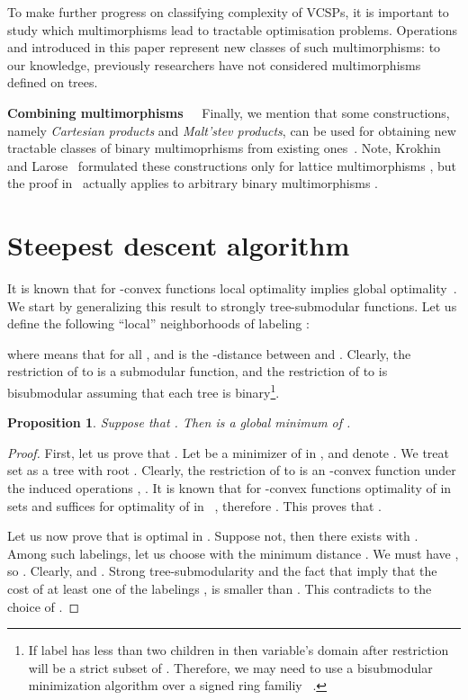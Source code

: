 \documentclass[11pt,onecolumn]{article}
\newtheorem{proposition}[theorem]{Proposition}
\newcommand{\myparagraph}[1]{{\vspace*{2pt}\noindent\bf{#1}~~}}
\begin{document}
To make further progress on classifying complexity of VCSPs, it is important to study which
multimorphisms lead to tractable optimisation problems. Operations  and  introduced in this paper
represent new classes of such multimorphisms: to our knowledge, previously researchers have not considered multimorphisms
defined on trees.

\myparagraph{Combining multimorphisms} Finally, we mention that some constructions, namely {\em Cartesian products} and {\em Malt'stev products},
can be used for obtaining new tractable classes of binary multimoprhisms from existing ones~\cite{KrokhinLarose:08}.
Note, Krokhin and Larose~\cite{KrokhinLarose:08} formulated these constructions only
for lattice multimorphisms , but the proof in~\cite{KrokhinLarose:08} actually applies to arbitrary binary multimorphisms .


\section{Steepest descent algorithm}\label{sec:alg}

It is known that for -convex functions local optimality implies global optimality~\cite{Murota:book}.
We start by generalizing this result to strongly tree-submodular functions. 
Let us define the following ``local'' neighborhoods of labeling :

where  means that  for all , and  is the -distance between  and .
Clearly, the restriction of  to  is a submodular function,
and the restriction of  to  is bisubmodular assuming that each tree  is binary\footnote{If label 
has less than two children in  then variable's domain after restriction will be a strict subset of .
Therefore, we may need to use a bisubmodular minimization algorithm over a signed ring familiy ~\cite{McCormick:10}.}.

\begin{proposition} Suppose that {\em .} Then  is a global minimum of .
\label{prop:local}
\end{proposition}
\begin{proof}
First, let us prove that .
Let  be a minimizer of  in , and denote .
We treat set  as a tree with root .
Clearly, the restriction of  to  is an -convex function under 
the induced operations , . It is known that for -convex functions
optimality of  in sets  and 
suffices for optimality of  in ~\cite[Theorem 7.14]{Murota:book}, therefore .
This proves that .

Let us now prove that  is optimal in .
Suppose not, then there exists  with .
Among such labelings, let us choose  with the minimum distance . We must have , so . Clearly,
 and .
Strong tree-submodularity and the fact that 
imply that the cost of at least one of the labelings ,  is smaller than .
This contradicts to the choice of .
\end{proof}
\end{document}
